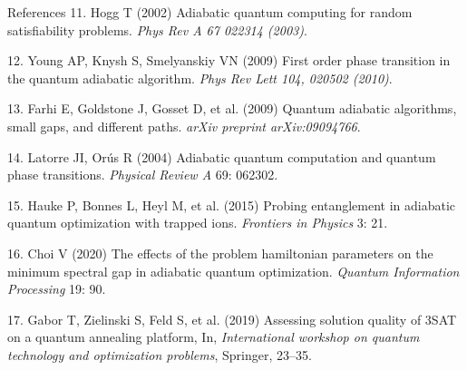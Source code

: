 \documentclass[
  ignorenonframetext,
]{beamer}
\begin{document}
\begin{frame}[allowframebreaks]{References}
\leavevmode\hypertarget{ref-Hogg2002}{}%
11. Hogg T (2002) Adiabatic quantum computing for random satisfiability
problems. \emph{Phys Rev A 67 022314 (2003)}.

\leavevmode\hypertarget{ref-Young2009}{}%
12. Young AP, Knysh S, Smelyanskiy VN (2009) First order phase
transition in the quantum adiabatic algorithm. \emph{Phys Rev Lett 104,
020502 (2010)}.

\leavevmode\hypertarget{ref-Farhi2009}{}%
13. Farhi E, Goldstone J, Gosset D, et al. (2009) Quantum adiabatic
algorithms, small gaps, and different paths. \emph{arXiv preprint
arXiv:09094766}.

\leavevmode\hypertarget{ref-Latorre2004}{}%
14. Latorre JI, Orús R (2004) Adiabatic quantum computation and quantum
phase transitions. \emph{Physical Review A} 69: 062302.

\leavevmode\hypertarget{ref-Hauke2015}{}%
15. Hauke P, Bonnes L, Heyl M, et al. (2015) Probing entanglement in
adiabatic quantum optimization with trapped ions. \emph{Frontiers in
Physics} 3: 21.

\leavevmode\hypertarget{ref-Choi2020}{}%
16. Choi V (2020) The effects of the problem hamiltonian parameters on
the minimum spectral gap in adiabatic quantum optimization.
\emph{Quantum Information Processing} 19: 90.

\leavevmode\hypertarget{ref-Gabor2019}{}%
17. Gabor T, Zielinski S, Feld S, et al. (2019) Assessing solution
quality of 3SAT on a quantum annealing platform, In, \emph{International
workshop on quantum technology and optimization problems}, Springer,
23--35.

\end{frame}
\end{document}
